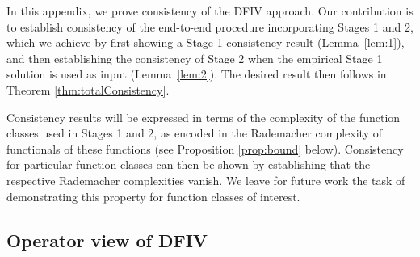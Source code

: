 In this appendix, we prove consistency of the DFIV approach.
Our contribution is to establish consistency of the end-to-end procedure incorporating Stages 1 and 2, which we achieve by first showing a Stage 1 consistency result (Lemma~\ref{lem:1}), and then establishing the consistency of Stage 2 when the empirical Stage 1 solution is used as input (Lemma~\ref{lem:2}).  The desired result then follows in Theorem \ref{thm:totalConsistency}.

Consistency results will be expressed in terms of the complexity of the function classes used in Stages 1 and 2, as encoded in the Rademacher complexity of functionals of these functions (see Proposition \ref{prop:bound} below).  Consistency for particular function classes can then be shown by establishing that the respective Rademacher complexities vanish. We leave for future work the task of demonstrating this property for function classes of interest.









\subsection{Operator view of DFIV}

